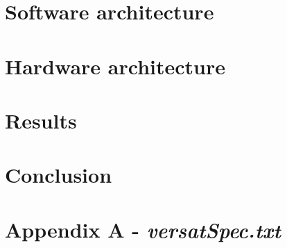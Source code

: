 \documentclass[10pt]{esda}
\begin{document}
\cleardoublepage
\section{Software architecture}
\label{sec:sw}


\cleardoublepage
\section{Hardware architecture}
\label{sec:hw}


\cleardoublepage
\section{Results}
\label{sec:results}


\cleardoublepage
\section{Conclusion}
\label{sec:conc}


\cleardoublepage
{}




\cleardoublepage

\section*{Appendix A - \textbf{\textit{versatSpec.txt}}}
\appendix

\end{document}
